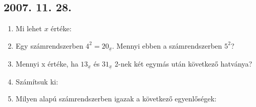 \subsection*{2007. 11. 28.}
\begin{enumerate}
\item Mi lehet $x$ értéke:
\item Egy számrendszerben $4^2=20_{\underline{x}}$. Mennyi ebben a számrendszerben $5^2$?
\item Mennyi x értéke, ha $13_{\underline{x}}$ és $31_{\underline{x}}$ 2-nek két egymás után következő hatványa?
\item Számítsuk ki:
\item Milyen alapú számrendszerben igazak a következő egyenlőségek: 
\end{enumerate}


